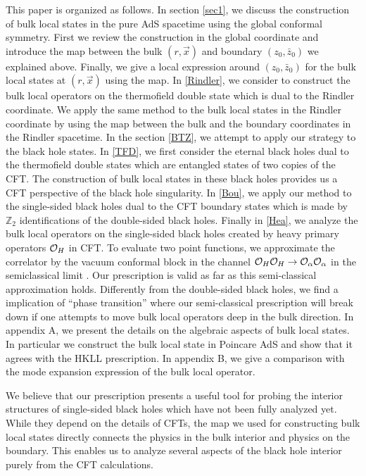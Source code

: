 \documentclass[11pt,a4paper]{article}
\def\a{{\alpha}}
\def\CO{{\cal O}}
\def\r{\rightarrow}
\def\r{\rightarrow}
\def\z{\bar{z}}
\begin{document}
This paper is organized as follows. In section \ref{sec1}, we discuss the construction of bulk local states in the pure AdS spacetime using the global conformal symmetry. First we review the construction in the global coordinate and introduce the map between the bulk $(r,\vec{x})$ and boundary $(z_0,\z_0)$ we explained above. Finally, we give a local expression around $(z_0,\z_0)$ for the bulk local states at $(r,\vec{x})$ using the map. In \ref{Rindler}, we consider to construct the bulk local operators on the thermofield double state which is dual to the Rindler coordinate. We apply the same method to the bulk local states in the Rindler coordinate by using the map between the bulk  and the boundary coordinates in the Rindler spacetime. In the section \ref{BTZ}, we attempt to apply our strategy to the black hole states. In \ref{TFD}, we first consider the eternal black holes dual to the thermofield double states which are entangled states of two copies of the CFT. The construction of bulk local states in these black holes provides us a CFT perspective of the black hole singularity. In \ref{Bou}, we apply our method to the single-sided black holes dual to the CFT boundary states which is made by $\mathbb{Z}_2$ identifications of the double-sided black holes. Finally in  \ref{Hea}, we analyze the bulk local operators on the single-sided black holes created by heavy primary operators $\CO_H$ in CFT. To evaluate two point functions, we approximate the correlator by the vacuum conformal block in the channel $\CO_H\CO_H\r\CO_\a\CO_\a$ in the semiclassical  limit \cite{Hart}\cite{FKW1}\cite{FKW2}. Our prescription is valid as far as this semi-classical approximation holds. Differently from the double-sided black holes, we find a implication of ``phase transition'' where our semi-classical prescription will break down if one attempts to move bulk local operators %
deep in the bulk direction. In appendix A, we present the details on the algebraic aspects of bulk local states. In particular we construct the bulk local state in Poincare AdS and show that it agrees with the HKLL prescription. In appendix B, we give a comparison with the mode expansion expression of
the bulk local operator.



We believe that our prescription presents a useful tool for probing the interior structures of single-sided black holes which have not been fully analyzed yet. While they depend on the details of CFTs, the map we used for constructing bulk local states directly connects the physics in the bulk interior and physics on the boundary. This enables us to analyze several aspects of the black hole interior purely from the CFT calculations.
\end{document}
